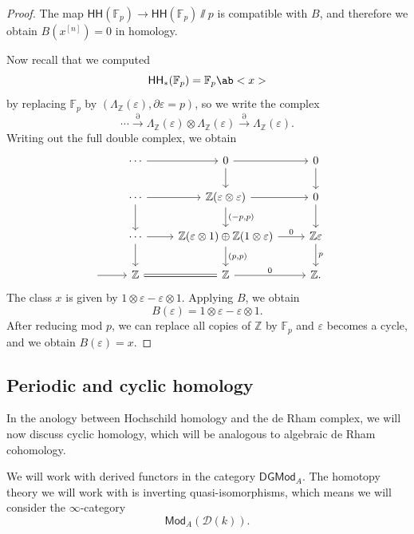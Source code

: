 \documentclass[10pt, oneside]{memoir}
\theoremstyle{definition}
\theoremstyle{remark}
\theoremstyle{plain}
\theoremstyle{definition}
\theoremstyle{remark}
\newcommand{\Z}{\mathbb{Z}}
\newcommand{\F}{\mathbb{F}}
\newcommand{\ep}{\varepsilon}
\newcommand{\mc}[1]{\mathcal{#1}}
\newcommand{\ms}[1]{\mathsf{#1}}
\newcommand{\1}{\mathbf{1}}
\newcommand{\2}{\mathbf{2}}
\newcommand{\3}{\mathbf{3}}
\newcommand{\HH}{\ms{HH}}
\begin{document}
\begin{proof}
    The map \(\HH(\F_p) \to \HH(\F_p) \sslash p \) is compatible with \(B \), and therefore we obtain \(B(x^{[n]}) = 0 \) in homology.

    Now recall that we computed
    \[ \HH_*(\F_p) = \F_p\ab<x> \]
    by replacing \(\F_p \) by \((\Lambda_{\Z}(\ep), \partial \ep = p) \), so we write the complex
    \[ \cdots \xrightarrow{\partial} \Lambda_{\Z}(\ep) \otimes \Lambda_{\Z} (\ep) \xrightarrow{\partial} \Lambda_{\Z}(\ep). \]
    Writing out the full double complex, we obtain
    \begin{equation*}
    \begin{tikzcd}
        &\cdots \ar{r} & 0 \ar{r} \ar{d} & 0 \ar{d} \\
        &\cdots \ar{r} \ar{d} & \Z(\ep \otimes \ep) \ar{r} \ar{d}{(-p,p)} & 0 \ar{d} \\
        &\cdots \ar{r} \ar{d} & \Z(\ep \otimes 1) \oplus \Z(1 \otimes \ep) \ar{r}{0} \ar{d}{(p,p)}& \Z \ep \ar{d}{p} \\
        {}\ar{r}&\Z \ar[equals]{r} & \Z \ar{r}{0} & \Z.
    \end{tikzcd}
    \end{equation*}
    The class \(x \) is given by \(1 \otimes \ep - \ep \otimes 1 \). Applying \(B \), we obtain
    \[ B(\ep) = 1 \otimes \ep - \ep \otimes 1. \]
    After reducing mod \(p \), we can replace all copies of \(\Z \) by \(\F_p \) and \(\ep \) becomes a cycle, and we obtain \(B(\ep) = x \).
\end{proof}

\subsection{Periodic and cyclic homology}%
\label{sub:Periodic and cyclic homology}

In the anology between Hochschild homology and the de Rham complex, we will now discuss cyclic homology, which will be analogous to algebraic de Rham cohomology.

We will work with derived functors in the category \(\ms{DGMod}_A \). The homotopy theory we will work with is inverting quasi-isomorphisms, which means we will consider the \(\infty \)-category
\[ \ms{Mod}_A(\mc{D}(k)). \]
\end{document}
